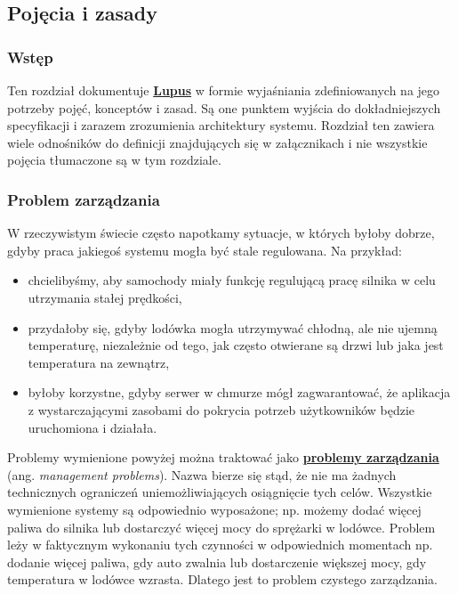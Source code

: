 \subsection{Pojęcia i zasady}

\subsubsection{Wstęp}
Ten rozdział dokumentuje \hyperlink{def:lupus}{\textbf{Lupus}} w formie wyjaśniania zdefiniowanych na jego potrzeby pojęć, konceptów i zasad. Są one punktem wyjścia do dokładniejszych specyfikacji i zarazem zrozumienia architektury systemu. Rozdział ten zawiera wiele odnośników do definicji znajdujących się w załącznikach i nie wszystkie pojęcia tłumaczone są w tym rozdziale.

\subsubsection{Problem zarządzania}

W rzeczywistym świecie często napotkamy sytuacje, w których byłoby dobrze, gdyby praca jakiegoś systemu mogła być stale regulowana. Na przykład:

\begin{itemize}
    \item chcielibyśmy, aby samochody miały funkcję regulującą pracę silnika w celu utrzymania stałej prędkości,
    \item przydałoby się, gdyby lodówka mogła utrzymywać chłodną, ale nie ujemną temperaturę, niezależnie od tego, jak często otwierane są drzwi lub jaka jest temperatura na zewnątrz,
    \item byłoby korzystne, gdyby serwer w chmurze mógł zagwarantować, że aplikacja z wystarczającymi zasobami do pokrycia potrzeb użytkowników będzie uruchomiona i działała.
\end{itemize}

Problemy wymienione powyżej można traktować jako \hyperlink{def:problem-zarzadzania}{\textbf{problemy zarządzania}} (ang. \textit{management problems}). Nazwa bierze się stąd, że nie ma żadnych technicznych ograniczeń uniemożliwiających osiągnięcie tych celów. Wszystkie wymienione systemy są odpowiednio wyposażone; np. możemy dodać więcej paliwa do silnika lub dostarczyć więcej mocy do sprężarki w lodówce. Problem leży w faktycznym wykonaniu tych czynności w odpowiednich momentach np. dodanie więcej paliwa, gdy auto zwalnia lub dostarczenie większej mocy, gdy temperatura w lodówce wzrasta. Dlatego jest to problem czystego zarządzania.

